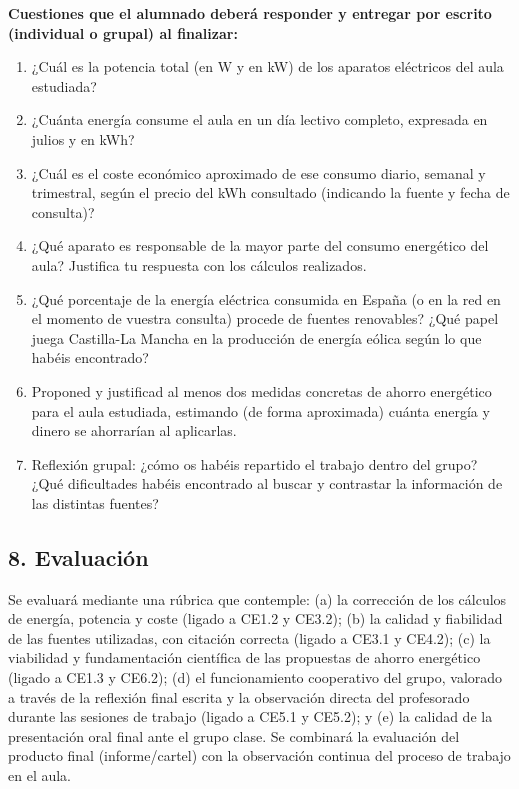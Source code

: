\documentclass[11pt,a4paper]{article}
\begin{document}
\textbf{Cuestiones que el alumnado deberá responder y entregar por escrito (individual o grupal) al finalizar:}
\begin{enumerate}
    \item ¿Cuál es la potencia total (en W y en kW) de los aparatos eléctricos del aula estudiada?
    \item ¿Cuánta energía consume el aula en un día lectivo completo, expresada en julios y en kWh?
    \item ¿Cuál es el coste económico aproximado de ese consumo diario, semanal y trimestral, según el precio del kWh consultado (indicando la fuente y fecha de consulta)?
    \item ¿Qué aparato es responsable de la mayor parte del consumo energético del aula? Justifica tu respuesta con los cálculos realizados.
    \item ¿Qué porcentaje de la energía eléctrica consumida en España (o en la red en el momento de vuestra consulta) procede de fuentes renovables? ¿Qué papel juega Castilla-La Mancha en la producción de energía eólica según lo que habéis encontrado?
    \item Proponed y justificad al menos dos medidas concretas de ahorro energético para el aula estudiada, estimando (de forma aproximada) cuánta energía y dinero se ahorrarían al aplicarlas.
    \item Reflexión grupal: ¿cómo os habéis repartido el trabajo dentro del grupo? ¿Qué dificultades habéis encontrado al buscar y contrastar la información de las distintas fuentes?
\end{enumerate}

\subsection*{8. Evaluación}
Se evaluará mediante una rúbrica que contemple: (a) la corrección de los cálculos de energía, potencia y coste (ligado a CE1.2 y CE3.2); (b) la calidad y fiabilidad de las fuentes utilizadas, con citación correcta (ligado a CE3.1 y CE4.2); (c) la viabilidad y fundamentación científica de las propuestas de ahorro energético (ligado a CE1.3 y CE6.2); (d) el funcionamiento cooperativo del grupo, valorado a través de la reflexión final escrita y la observación directa del profesorado durante las sesiones de trabajo (ligado a CE5.1 y CE5.2); y (e) la calidad de la presentación oral final ante el grupo clase. Se combinará la evaluación del producto final (informe/cartel) con la observación continua del proceso de trabajo en el aula.
\end{document}
